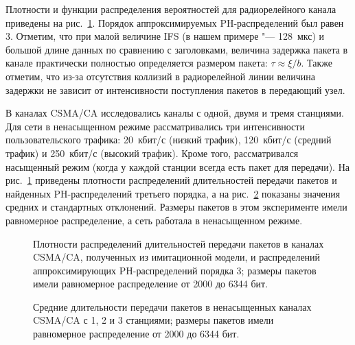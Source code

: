Плотности и функции распределения вероятностей для радиорелейного канала приведены на рис.~\ref{fig:ch4_fitting_dcf_delays}. Порядок аппроксимируемых PH-распределений был равен 3. Отметим, что при малой величине IFS (в нашем примере "--- 128~мкс) и большой длине данных по сравнению с заголовками, величина задержка пакета в канале практически полностью определяется размером пакета: $\tau \approx \xi / b$. Также отметим, что из-за отсутствия коллизий в радиорелейной линии величина задержки не зависит от интенсивности поступления пакетов в передающий узел.

В каналах CSMA/CA исследовались каналы с одной, двумя и тремя станциями. Для сети в ненасыщенном режиме рассматривались три интенсивности пользовательского трафика: 20~кбит/с (низкий трафик), 120~кбит/с (средний трафик) и 250~кбит/с (высокий трафик). Кроме того, рассматривался насыщенный режим (когда у каждой станции всегда есть пакет для передачи). На рис.~\ref{fig:ch4_fitting_dcf_delays} приведены плотности распределений длительностей передачи пакетов и найденных PH-распределений третьего порядка, а на рис.~\ref{fig:ch4_fitting_dcf_means_123} показаны значения средних и стандартных отклонений. Размеры пакетов в этом эксперименте имели равномерное распределение, а сеть работала в ненасыщенном режиме.

\begin{figure}[h]
  \caption{Плотности распределений длительностей передачи пакетов в каналах CSMA/CA, полученных из имитационной модели, и распределений аппроксимирующих PH-распределений порядка 3; размеры пакетов имели равномерное распределение от 2000 до 6344 бит.}
  \label{fig:ch4_fitting_dcf_delays}
\end{figure}

\begin{figure}[h]
  \caption{Средние длительности передачи пакетов в ненасыщенных каналах CSMA/CA с 1, 2 и 3 станциями; размеры пакетов имели равномерное распределение от 2000 до 6344 бит.}
  \label{fig:ch4_fitting_dcf_means_123}
\end{figure}

